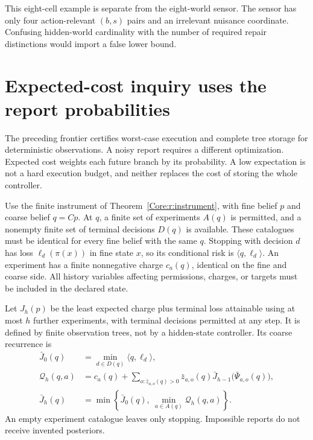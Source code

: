 This eight-cell example is separate from the eight-world sensor. The sensor has only four action-relevant $(b,s)$ pairs and an irrelevant nuisance coordinate. Confusing hidden-world cardinality with the number of required repair distinctions would import a false lower bound.


\section{Expected-cost inquiry uses the report probabilities}
The preceding frontier certifies worst-case execution and complete tree storage for deterministic observations. A noisy report requires a different optimization. Expected cost weights each future branch by its probability. A low expectation is not a hard execution budget, and neither replaces the cost of storing the whole controller.

Use the finite instrument of Theorem~\ref{Core:r:instrument}, with fine belief $p$ and coarse belief $q=Cp$. At $q$, a finite set of experiments $A(q)$ is permitted, and a nonempty finite set of terminal decisions $D(q)$ is available. These catalogues must be identical for every fine belief with the same $q$. Stopping with decision $d$ has loss $\ell_d(\pi(x))$ in fine state $x$, so its conditional risk is $\langle q,\ell_d\rangle$. An experiment has a finite nonnegative charge $c_a(q)$, identical on the fine and coarse side. All history variables affecting permissions, charges, or targets must be included in the declared state.

Let $J_h(p)$ be the least expected charge plus terminal loss attainable using at most $h$ further experiments, with terminal decisions permitted at any step. It is defined by finite observation trees, not by a hidden-state controller. Its coarse recurrence is
\begin{align*}
 \bar J_0(q)&=\min_{d\in D(q)}\langle q,\ell_d\rangle,\\
 \mathcal Q_h(q,a)&=c_a(q)+\sum_{o:\bar z_{a,o}(q)>0}
       \bar z_{a,o}(q)\bar J_{h-1}\bigl(\bar\Psi_{a,o}(q)\bigr),\\
 \bar J_h(q)&=\min\left\{\bar J_0(q),\ \min_{a\in A(q)}\mathcal Q_h(q,a)\right\}.
\end{align*}
An empty experiment catalogue leaves only stopping. Impossible reports do not receive invented posteriors.

